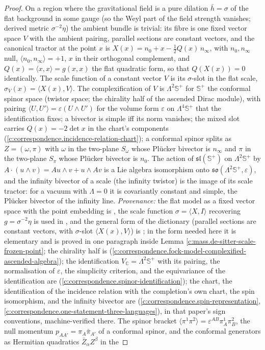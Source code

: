 \documentclass[11pt]{article}
\theoremstyle{definition}
\theoremstyle{plain}
\providecommand{\C}{}\renewcommand{\C}{\mathbb{C}}
\providecommand{\CS}{}\renewcommand{\CS}{{\mathbb{S}^{+}}}
\providecommand{\Som}{}\renewcommand{\Som}{S_\omega}
\providecommand{\Spi}{}\renewcommand{\Spi}{S_\pi}
\providecommand{\hb}{}\renewcommand{\hb}{\bar{h}}
\providecommand{\br}{}\renewcommand{\br}[1]{\langle #1\rangle}
\providecommand{\ip}{}\renewcommand{\ip}[2]{\langle #1, #2\rangle}
\begin{document}
\begin{proof}
On a region where the gravitational field is a pure dilation $\hb = \sigma$ of the flat background in some gauge (so the Weyl part of the field strength vanishes; derived metric $\sigma^{-2}\eta$) the ambient bundle is trivial: its fibre is one fixed vector space $V$ with the ambient pairing, parallel sections are constant vectors, and the canonical tractor at the point $x$ is $X(x) = n_{0} + x - \tfrac12 Q(x)\, n_{\infty}$, with $n_{0}, n_{\infty}$ null, $\ip{n_{0}}{n_{\infty}} = +1$, $x$ in their orthogonal complement, and $Q(x) = \ip{x}{x} = g(x,x)$ the flat quadratic form, so that $Q(X(x)) = 0$ identically. The scale function of a constant vector $V$ is its $\sigma$-slot in the flat scale, $\sigma_{V}(x) = \ip{X(x)}{V}$. The complexification of $V$ is $\Lambda^{2}\CS$ for $\CS$ the conformal spinor space (twistor space; the chirality half of the ascended Dirac module), with pairing $\ip{U}{U'} = \varepsilon(U \wedge U')$ for the volume form $\varepsilon$ on $\Lambda^{4}\CS$ that the identification fixes; a bivector is simple iff its norm vanishes; the mixed slot carries $Q(x) = -2\det x$ in the chart's components \cite[Thm.~4.2(2)]{ButlerT9} (\ref{c:correspondence.incidence-relation-chart}); a conformal spinor splits as $Z = (\omega, \pi)$ with $\omega$ in the two-plane $\Som$ whose Pl\"ucker bivector is $n_{\infty}$ and $\pi$ in the two-plane $\Spi$ whose Pl\"ucker bivector is $n_{0}$. The action of $\mathfrak{sl}(\CS)$ on $\Lambda^{2}\CS$ by $A\cdot(u \wedge v) = Au \wedge v + u \wedge Av$ is a Lie algebra isomorphism onto $\mathfrak{so}(\Lambda^{2}\CS, \varepsilon)$, and the infinity bivector of a scale (the infinity twistor) is the image of its scale tractor: for a vacuum with $\Lambda = 0$ it is covariantly constant and simple, the Pl\"ucker bivector of the infinity line. \emph{Provenance:} the flat model as a fixed vector space with the point embedding is \cite[\S4.2]{ButlerT6}, the scale function $\sigma = \ip{X}{I}$ recovering $g = \sigma^{-2}\eta$ is used in \cite[Lem.~4.8]{ButlerT6}, and the general form of the dictionary (parallel sections are constant vectors, with $\sigma$-slot $\ip{X(x)}{V}$) is \cite[\S2]{BEG1994}; in the form needed here it is elementary and is proved in one paragraph inside Lemma \ref{c:mass.de-sitter-scale-frozen-point}; the chirality half is \cite[Thm.~3.1]{ButlerT9} (\ref{c:correspondence.fock-model-complexified-ascended-algebra}); the identification $V_{\C} = \Lambda^{2}\CS$ with its pairing, the normalisation of $\varepsilon$, the simplicity criterion, and the equivariance of the identification are \cite[Thm.~3.4]{ButlerT9} (\ref{c:correspondence.spinor-identification}); the chart, the identification of the incidence relation with the completion's own chart, the spin isomorphism, and the infinity bivector are \cite[Thm.~4.2, Cor.~4.8, Prop.~5.2]{ButlerT9} (\ref{c:correspondence.spin-representation}, \ref{c:correspondence.one-statement-three-languages}), in that paper's sign conventions, machine-verified there. The spinor bracket $\br{\pi^{1}\pi^{2}} = \varepsilon^{AB}\pi^{1}_{A}\pi^{2}_{B}$, the null momentum $p_{AA'} = \pi_{A}\bar\pi_{A'}$ of a conformal spinor, and the conformal generators as Hermitian quadratics $\bar{Z}_{\alpha}Z^{\beta}$ in the 
\end{proof}
\end{document}
